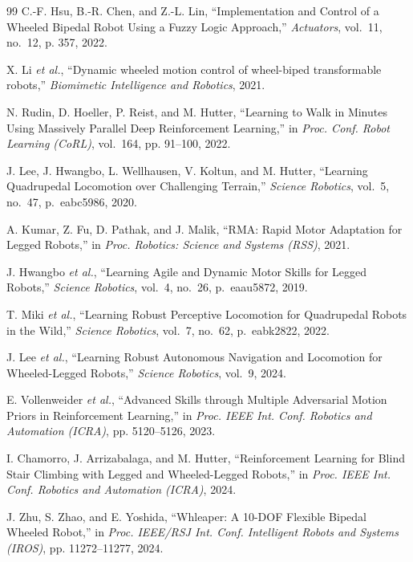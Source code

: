 \documentclass[conference]{IEEEtran}
\begin{document}
\begin{thebibliography}{99}
C.-F. Hsu, B.-R. Chen, and Z.-L. Lin,
``Implementation and Control of a Wheeled Bipedal Robot Using
a Fuzzy Logic Approach,''
\emph{Actuators}, vol.~11, no.~12, p. 357, 2022.

X. Li \emph{et al.},
``Dynamic wheeled motion control of wheel-biped transformable robots,''
\emph{Biomimetic Intelligence and Robotics}, 2021.

N. Rudin, D. Hoeller, P. Reist, and M. Hutter,
``Learning to Walk in Minutes Using Massively Parallel Deep Reinforcement Learning,''
in \emph{Proc. Conf. Robot Learning (CoRL)}, vol.~164, pp. 91--100, 2022.

J. Lee, J. Hwangbo, L. Wellhausen, V. Koltun, and M. Hutter,
``Learning Quadrupedal Locomotion over Challenging Terrain,''
\emph{Science Robotics}, vol.~5, no.~47, p.~eabc5986, 2020.

A. Kumar, Z. Fu, D. Pathak, and J. Malik,
``RMA: Rapid Motor Adaptation for Legged Robots,''
in \emph{Proc. Robotics: Science and Systems (RSS)}, 2021.

J. Hwangbo \emph{et al.},
``Learning Agile and Dynamic Motor Skills for Legged Robots,''
\emph{Science Robotics}, vol.~4, no.~26, p.~eaau5872, 2019.

T. Miki \emph{et al.},
``Learning Robust Perceptive Locomotion for Quadrupedal Robots in the Wild,''
\emph{Science Robotics}, vol.~7, no.~62, p.~eabk2822, 2022.

J. Lee \emph{et al.},
``Learning Robust Autonomous Navigation and Locomotion for Wheeled-Legged Robots,''
\emph{Science Robotics}, vol.~9, 2024.

E. Vollenweider \emph{et al.},
``Advanced Skills through Multiple Adversarial Motion Priors in Reinforcement Learning,''
in \emph{Proc. IEEE Int. Conf. Robotics and Automation (ICRA)}, pp. 5120--5126, 2023.

I. Chamorro, J. Arrizabalaga, and M. Hutter,
``Reinforcement Learning for Blind Stair Climbing with Legged and Wheeled-Legged Robots,''
in \emph{Proc. IEEE Int. Conf. Robotics and Automation (ICRA)}, 2024.

J. Zhu, S. Zhao, and E. Yoshida,
``Whleaper: A 10-DOF Flexible Bipedal Wheeled Robot,''
in \emph{Proc. IEEE/RSJ Int. Conf. Intelligent Robots and Systems (IROS)},
pp. 11272--11277, 2024.


\end{thebibliography}
\end{document}
